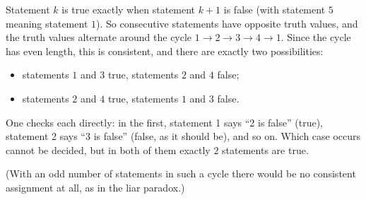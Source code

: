 Statement $k$ is true exactly when statement $k+1$ is false (with statement $5$ meaning statement $1$). So consecutive statements have opposite truth values, and the truth values alternate around the cycle $1\to2\to3\to4\to1$. Since the cycle has even length, this is consistent, and there are exactly two possibilities:
\begin{itemize}
\item statements $1$ and $3$ true, statements $2$ and $4$ false;
\item statements $2$ and $4$ true, statements $1$ and $3$ false.
\end{itemize}
One checks each directly: in the first, statement 1 says ``2 is false'' (true), statement 2 says ``3 is false'' (false, as it should be), and so on. Which case occurs cannot be decided, but in both of them exactly $\boxed{2}$ statements are true.

(With an odd number of statements in such a cycle there would be no consistent assignment at all, as in the liar paradox.)
